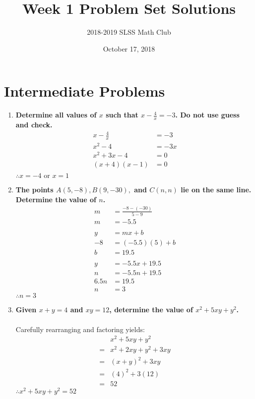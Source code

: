 \documentclass[12pt]{article}
\title{Week 1 Problem Set Solutions\vspace{-3mm}}
\author{2018-2019 SLSS Math Club\vspace{-5mm}}
\date{October 17, 2018 \vspace{-5mm}}
\begin{document}
\maketitle

\section*{Intermediate Problems}
\begin{enumerate}
    \item \textbf{Determine all values of $x$ such that $x - \frac{4}{x} = -3$. Do not use guess and check.} 
    \begin{align*}
            x-\frac{4}{x} &= -3 \\
            x^2-4 &= -3x \\
            x^2+3x-4 &= 0 \\
            (x+4)(x-1) &= 0 \\
    \end{align*}
    $\therefore x = -4 \text{ or } x = 1$
    
    \item \textbf{The points $A(5, -8), B(9, -30),$ and $C(n, n)$ lie on the same line. Determine the value of $n$.}
    \begin{align*}
        m &= \frac{-8-(-30)}{5-9} \\
        m &= -5.5 \\ \\
        y &= mx+b \\
        -8 &= (-5.5)(5)+b \\
        b &= 19.5 \\ \\
        y &= -5.5x+19.5 \\
        n &= -5.5n+19.5 \\
        6.5n &= 19.5 \\
        n &= 3
    \end{align*}
    $\therefore n = 3$
    
    \item \textbf{Given $x + y = 4$ and $xy = 12$, determine the value of $x^2 + 5xy + y^2$.} \\ \\
    Carefully rearranging and factoring yields:    
    \begin{align*}
        &x^2+5xy+y^2 \\
        =& x^2+2xy+y^2+3xy \\
        =& (x+y)^2+3xy \\
        =& (4)^2+3(12) \\
        =& 52
    \end{align*}
    $\therefore x^2 + 5xy + y^2 = 52$
\end{enumerate}
\end{document}
